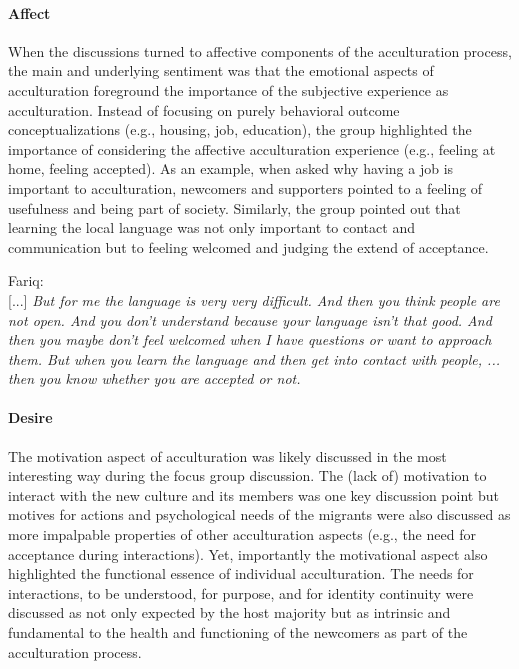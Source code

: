 \documentclass[nobib]{tufte-handout}
\begin{document}
\paragraph{Affect} When the discussions turned to affective components of the acculturation process, the main and underlying sentiment was that the emotional aspects of acculturation foreground the importance of the subjective experience as acculturation. Instead of focusing on purely behavioral outcome conceptualizations (e.g., housing, job, education), the group highlighted the importance of considering the affective acculturation experience (e.g., feeling at home, feeling accepted). As an example, when asked why having a job is important to acculturation, newcomers and supporters pointed to a feeling of usefulness and being part of society. Similarly, the group pointed out that learning the local language was not only important to contact and communication but to feeling welcomed and judging the extend of acceptance. 
\begin{displayquote}
    Fariq:\\
    {[...]} \textit{But for me the language is very very difficult. And then you think people are not open. And you don't understand because your language isn't that good. And then you maybe don't feel welcomed when I have questions or want to approach them. But when you learn the language and then get into contact with people, ... then you know whether you are accepted or not.}
\end{displayquote}

\paragraph{Desire} The motivation aspect of acculturation was likely discussed in the most interesting way during the focus group discussion. The (lack of) motivation to interact with the new culture and its members was one key discussion point but motives for actions and psychological needs of the migrants were also discussed as more impalpable properties of other acculturation aspects (e.g., the need for acceptance during interactions). Yet, importantly the motivational aspect also highlighted the functional essence of individual acculturation. The needs for interactions, to be understood, for purpose, and for identity continuity were discussed as not only expected by the host majority but as intrinsic and fundamental to the health and functioning of the newcomers as part of the acculturation process.
\end{document}
